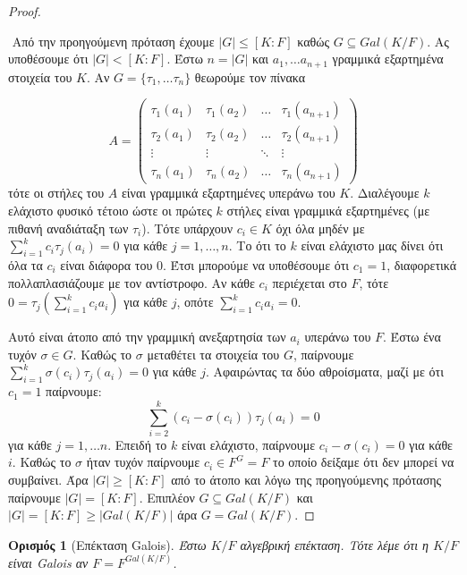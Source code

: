 \documentclass[oneside,a4paper]{article}
\newtheorem*{defn}{Ορισμός}
\newcommand {\tl}{\textlatin}
\begin{document}
\begin{proof} $ $

	$ $\newline
	Από την προηγούμενη πρόταση έχουμε $|G| \leq [K:F]$ καθώς $G\subseteq Gal(K/F)$. Ας υποθέσουμε ότι $|G| < [K:F]$. Έστω $n = |G|$ και $a_1 , \ldots a_{n+1}$ γραμμικά εξαρτημένα στοιχεία του $K$. Αν $G = \{\tau_1 ,\ldots \tau_n\}$ θεωρούμε τον πίνακα

	\[A = 
	\begin{pmatrix}
		\tau_1 (a_1) & \tau_1 (a_2) & \ldots  & \tau_1 (a_{n+1}) \\
		\tau_2 (a_1) & \tau_2 (a_2) & \ldots & \tau_2 (a_{n+1}) \\
		\vdots & \vdots & \ddots & \vdots \\
		\tau_n (a_1) & \tau_n (a_2) & \ldots & \tau_n (a_{n+1})
	\end{pmatrix}
	\]
	τότε οι στήλες του $A$ είναι γραμμικά εξαρτημένες υπεράνω του $K$. Διαλέγουμε $k$ ελάχιστο φυσικό τέτοιο ώστε οι πρώτες $k$ στήλες είναι γραμμικά εξαρτημένες (με πιθανή αναδιάταξη των $\tau_i$). Τότε υπάρχουν $c_i \in K$ όχι όλα μηδέν με $\sum\limits_{i=1}^k c_i \tau_j (a_i) = 0$ για κάθε $j=1,\ldots,n$. Το ότι το $k$ είναι ελάχιστο μας δίνει ότι όλα τα $c_i$ είναι διάφορα του $0$. Έτσι μπορούμε να υποθέσουμε ότι $c_1 = 1$, διαφορετικά πολλαπλασιάζουμε με τον αντίστροφο. Αν κάθε $c_i$ περιέχεται στο $F$, τότε $0 = \tau_j \left(\sum\limits_{i=1}^k c_i a_i\right) $ για κάθε $j$, οπότε $\sum\limits_{i=1}^k c_i a_i = 0$.

	Αυτό είναι άτοπο από την γραμμική ανεξαρτησία των $a_i$ υπεράνω του $F$. Έστω ένα τυχόν $\sigma \in G$. Καθώς το $\sigma$ μεταθέτει τα στοιχεία του $G$, παίρνουμε $\sum\limits_{i=1}^k \sigma (c_i) \tau_j(a_i) = 0$ για κάθε $j$. Αφαιρώντας τα δύο αθροίσματα, μαζί με ότι $c_1 = 1$ παίρνουμε:
	$$\sum\limits_{i=2}^k (c_i -\sigma (c_i))\tau_j (a_i) = 0 $$
	για κάθε $j =1,\ldots n$. Επειδή το $k$ είναι ελάχιστο, παίρνουμε $c_i - \sigma(c_i) = 0$ για κάθε $i$. Καθώς το $\sigma$ ήταν τυχόν παίρνουμε $c_i \in F^G = F$ το οποίο δείξαμε ότι δεν μπορεί να συμβαίνει. Άρα $|G| \geq [K:F]$ από το άτοπο και λόγω της προηγούμενης πρότασης παίρνουμε $|G| = [K:F]$. Επιπλέον $G \subseteq Gal(K/F)$ και $|G| = [K:F] \geq |Gal(K/F)|$ άρα $G = Gal(K/F)$.
\end{proof}

\begin{defn}[Επέκταση \tl{Galois}]
	Έστω $K/F$ αλγεβρική επέκταση. Τότε λέμε ότι η $K/F$ είναι \tl{Galois} αν $F = F^{Gal(K/F)}$.
\end{defn}
\end{document}
